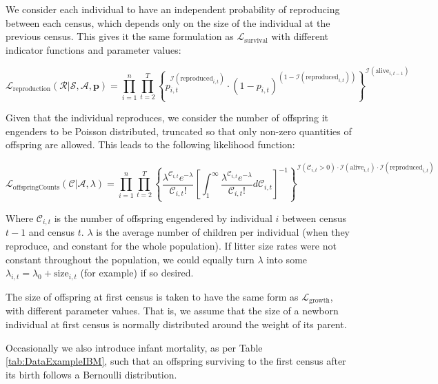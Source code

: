 \documentclass[a4paper,12pt]{article}
\begin{document}
We consider each individual to have an independent probability of reproducing between each census, which depends only on the size of the individual at the previous census. This gives it the same formulation as $\mathcal{L}_{\text{survival}}$ with different indicator functions and parameter values:

\begin{equation}
    \mathcal{L}_{\text{reproduction}}(\boldsymbol{\mathcal{R}}|\boldsymbol{\mathcal{S}}, \boldsymbol{\mathcal{A}}, \boldsymbol{p}) = \prod_{i=1}^n\prod_{t=2}^T \left\{p_{i,t}^{\mathcal{I}(\text{reproduced}_{i, t})} \cdot (1-p_{i,t})^{\left(1-\mathcal{I}(\text{reproduced}_{i, t})\right)}\right\}^{\mathcal{I}(\text{alive}_{i, t-1})}
\end{equation}

Given that the individual reproduces, we consider the number of offspring it engenders to be Poisson distributed, truncated so that only non-zero quantities of offspring are allowed. This leads to the following likelihood function:

\begin{equation}
    \mathcal{L}_{\text{offspringCounts}}(\boldsymbol{\mathcal{C}}| \boldsymbol{\mathcal{A}}, \lambda) =  \prod_{i=1}^n\prod_{t=2}^T \left\{\frac{\lambda^{\mathcal{C}_{i, t}}e^{-\lambda}}{\mathcal{C}_{i, t}!}\left[\int_1^{\infty}\frac{\lambda^{\mathcal{C}_{i, t}}e^{-\lambda}}{\mathcal{C}_{i, t}!}d\mathcal{C}_{i, t}\right]^{-1}\right\}^{\mathcal{I}(\mathcal{C}_{i, t}>0)\cdot\mathcal{I}(\text{alive}_{i, t})\cdot\mathcal{I}(\text{reproduced}_{i, t})}
\end{equation}

Where $\mathcal{C}_{i,t}$ is the number of offspring engendered by individual $i$ between census $t-1$ and census $t$. $\lambda$ is the average number of children per individual (when they reproduce, and constant for the whole population). If litter size rates were not constant throughout the population, we could equally turn $\lambda$ into some $\lambda_{i, t} = \lambda_0 + \text{size}_{i, t}$ (for example) if so desired.

The size of offspring at first census is taken to have the same form as $\mathcal{L}_{\text{growth}}$, with different parameter values. That is, we assume that the size of a newborn individual at first census is normally distributed around the weight of its parent.

Occasionally we also introduce infant mortality, as per Table \ref{tab:DataExampleIBM}, such that an offspring surviving to the first census after its birth follows a Bernoulli distribution.
\end{document}
